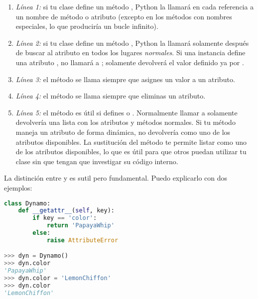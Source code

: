 \begin{enumerate}
  \item \emph{Línea 1:} si tu clase define un método , Python la llamará en cada referencia a un nombre de método o atributo (excepto en los métodos con nombres especiales, lo que produciría un bucle infinito).
  \item \emph{Línea 2:} si tu clase define un método , Python la llamará solamente después de buscar al atributo en todos los lugares \emph{normales}. Si una instancia  define una atributo ,  no llamará a ; solamente devolverá el valor definido ya por .
  \item \emph{Línea 3:} el método  se llama siempre que asignes un valor a un atributo.
  \item \emph{Línea 4:} el método  se llama siempre que eliminas un atributo.
  \item \emph{Línea 5:} el método  es útil si defines  o . Normalmente llamar a  solamente devolvería una lista con los atributos y métodos normales. Si tu método  maneja un atributo  de forma dinámica,  no devolvería  como uno de los atributos disponibles. La sustitución del método  te permite listar  como uno de los atributos disponibles, lo que es útil para que otros puedan utilizar tu clase sin que tengan que investigar su código interno.
\end{enumerate}

La distinción entre  y  es sutil pero fundamental. Puedo explicarlo con dos ejemplos:


\begin{lstlisting}[language=Python,breaklines=true,mathescape=false]
class Dynamo:
    def __getattr__(self, key):
        if key == 'color':         
            return 'PapayaWhip'
        else:
            raise AttributeError   

>>> dyn = Dynamo()
>>> dyn.color                      
'PapayaWhip'
>>> dyn.color = 'LemonChiffon'
>>> dyn.color                      
'LemonChiffon'
\end{lstlisting}


